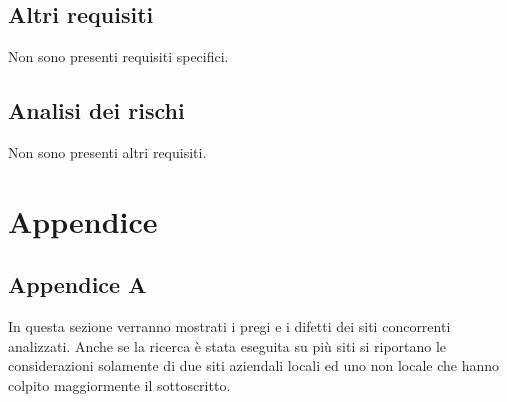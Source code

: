 \documentclass[a4paper,12pt,hidelinks]{report}
\begin{document}
\section{Altri requisiti}
  Non sono presenti requisiti specifici.

\section{Analisi dei rischi}
  Non sono presenti altri requisiti.

\chapter{Appendice}
\section{Appendice A}
  In questa sezione verranno mostrati i pregi e i difetti dei siti concorrenti analizzati. Anche se la ricerca è stata eseguita su più siti si riportano le considerazioni
  solamente di due siti aziendali locali ed uno non locale che hanno colpito maggiormente il sottoscritto.
\end{document}
